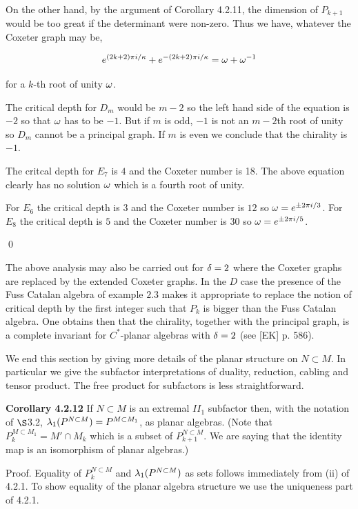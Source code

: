   On the other hand, by the argument of Corollary 4.2.11, the dimension
of $P_{k+1}$ would be too great if the determinant were non-zero. 
Thus we have, whatever the Coxeter graph may be,  

$$
{ e^{(2k+2)\pi i /\kappa} + e^{-(2k+2)\pi i /\kappa} = \omega + \omega ^{-1}}
$$

for a $k$-th root of unity $\omega$.

The critical depth for $D_m$ would 
be $m-2$ so the left hand side of the equation is $-2$ so that $\omega$ has to
be $-1$. But if $m$ is odd, $-1$ is not an $m-2$th root of unity so $D_m$ cannot
be a principal graph. If $m$ is even we conclude that the chirality is $-1$.

The critcal depth for $E_7$ is $4$ and the Coxeter number is 18. The above equation
clearly has no solution $\omega$ which is a fourth root of unity.

For $E_6$ the critical depth is $3$ and the Coxeter number is $12$ so $\omega = e^{\pm 2\pi i/3}$.
For $E_8$ the critical depth is $5$ and the Coxeter number is $30$ so $\omega = e^{\pm 2\pi i/5}$. 

 
\qed
 

  The above analysis may also be carried out for $\delta = 2$ where the Coxeter graphs are
replaced by the extended Coxeter graphs. In the $D$ case the presence of the Fuss Catalan 
algebra of example $2.3$ makes it appropriate to replace the notion of critical depth
by the first integer such that $P_k$ is bigger than the Fuss Catalan algebra. One obtains 
then that the chirality, together with the principal graph, is a complete invariant for
$C^*$-planar algebras with $\delta = 2$ (see [EK] p. 586).
  
We end this section by giving more details of the planar structure
on $N\subset M$. In particular we give the subfactor
interpretations of duality, reduction, cabling and tensor product.
The free product for subfactors is less straightforward.

\bs\ni
{\bf Corollary 4.2.12} If $N\subset M$ is an extremal $II_1$
subfactor then, with the notation of $\S$3.2,
$\lambda_1(P^{N\subset M})=P^{M\subset M_1}$, as planar algebras.
(Note that $P^{M\subset M_1}_k=M'\cap M_{k}$ which is a subset of
$P^{N\subset M}_{k+1}$. We are saying that the identity map is an
isomorphism of planar algebras.)

\bs
{\sc Proof.} Equality of $P^{N\subset M}_k$ and
$\lambda_1(P^{N\subset M})$ as sets follows immediately from (ii) of
4.2.1. To show equality of the planar algebra structure we use the
uniqueness part of 4.2.1.

